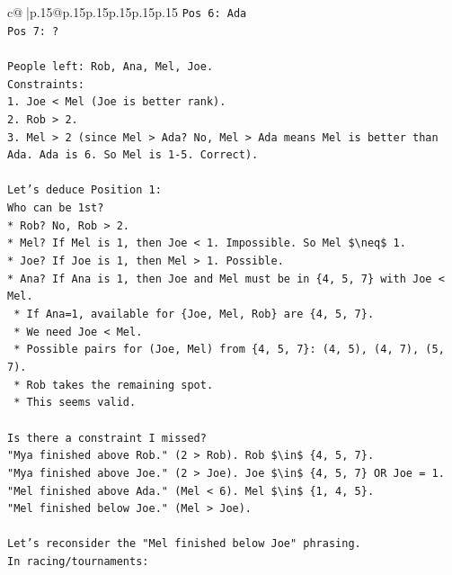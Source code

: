 \documentclass{article}
\begin{document}
{\begin{supertabular}{c@{$\;$}|p{.15\linewidth}@{}p{.15\linewidth}p{.15\linewidth}p{.15\linewidth}p{.15\linewidth}p{.15\linewidth}}
{{{\texttt{Pos 6: Ada} \\
\texttt{Pos 7: ?} \\
\\ 
\texttt{People left: Rob, Ana, Mel, Joe.} \\
\texttt{Constraints:} \\
\texttt{1.  Joe < Mel (Joe is better rank).} \\
\texttt{2.  Rob > 2.} \\
\texttt{3.  Mel > 2 (since Mel > Ada? No, Mel > Ada means Mel is better than Ada. Ada is 6. So Mel is 1{-}5. Correct).} \\
\\ 
\texttt{Let's deduce Position 1:} \\
\texttt{Who can be 1st?} \\
\texttt{*   Rob? No, Rob > 2.} \\
\texttt{*   Mel? If Mel is 1, then Joe < 1. Impossible. So Mel \$\textbackslash{}neq\$ 1.} \\
\texttt{*   Joe? If Joe is 1, then Mel > 1. Possible.} \\
\texttt{*   Ana? If Ana is 1, then Joe and Mel must be in \{4, 5, 7\} with Joe < Mel.} \\
\texttt{    *   If Ana=1, available for \{Joe, Mel, Rob\} are \{4, 5, 7\}.} \\
\texttt{    *   We need Joe < Mel.} \\
\texttt{    *   Possible pairs for (Joe, Mel) from \{4, 5, 7\}: (4, 5), (4, 7), (5, 7).} \\
\texttt{    *   Rob takes the remaining spot.} \\
\texttt{    *   This seems valid.} \\
\\ 
\texttt{Is there a constraint I missed?} \\
\texttt{"Mya finished above Rob." (2 > Rob). Rob \$\textbackslash{}in\$ \{4, 5, 7\}.} \\
\texttt{"Mya finished above Joe." (2 > Joe). Joe \$\textbackslash{}in\$ \{4, 5, 7\} OR Joe = 1.} \\
\texttt{"Mel finished above Ada." (Mel < 6). Mel \$\textbackslash{}in\$ \{1, 4, 5\}.} \\
\texttt{"Mel finished below Joe." (Mel > Joe).} \\
\\ 
\texttt{Let's reconsider the "Mel finished below Joe" phrasing.} \\
\texttt{In racing/tournaments:} \\
}}}
\end{supertabular}}
\end{document}
